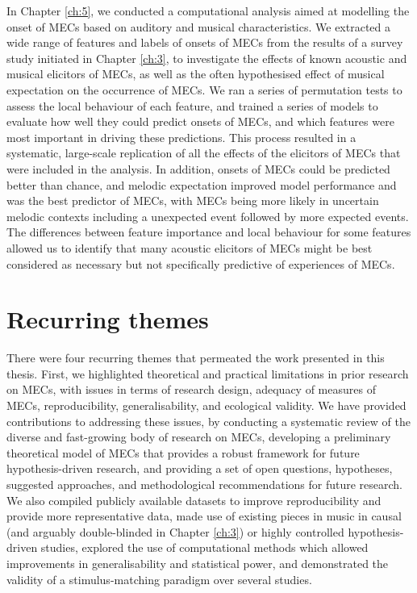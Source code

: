 In Chapter \ref{ch:5}, we conducted a computational analysis aimed at modelling the onset of MECs based on auditory and musical characteristics. We extracted a wide range of features and labels of onsets of MECs from the results of a survey study initiated in Chapter \ref{ch:3}, to investigate the effects of known acoustic and musical elicitors of MECs, as well as the often hypothesised effect of musical expectation on the occurrence of MECs. We ran a series of permutation tests to assess the local behaviour of each feature, and trained a series of models to evaluate how well they could predict onsets of MECs, and which features were most important in driving these predictions. This process resulted in a systematic, large-scale replication of all the effects of the elicitors of MECs that were included in the analysis. In addition, onsets of MECs could be predicted better than chance, and melodic expectation improved model performance and was the best predictor of MECs, with MECs being more likely in uncertain melodic contexts including a unexpected event followed by more expected events. The differences between feature importance and local behaviour for some features allowed us to identify that many acoustic elicitors of MECs might be best considered as necessary but not specifically predictive of experiences of MECs.

\section{Recurring themes}

There were four recurring themes that permeated the work presented in this thesis. First, we highlighted theoretical and practical limitations in prior research on MECs, with issues in terms of research design, adequacy of measures of MECs, reproducibility, generalisability, and ecological validity. We have provided contributions to addressing these issues, by conducting a systematic review of the diverse and fast-growing body of research on MECs, developing a preliminary theoretical model of MECs that provides a robust framework for future hypothesis-driven research, and providing a set of open questions, hypotheses, suggested approaches, and methodological recommendations for future research. We also compiled publicly available datasets to improve reproducibility and provide more representative data, made use of existing pieces in music in causal (and arguably double-blinded in Chapter \ref{ch:3}) or highly controlled hypothesis-driven studies, explored the use of computational methods which allowed improvements in generalisability and statistical power, and demonstrated the validity of a stimulus-matching paradigm over several studies.


